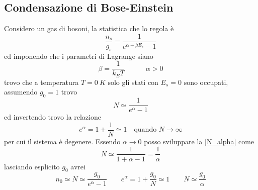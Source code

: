 \subsection{Condensazione di Bose-Einstein}
Considero un gas di bosoni, la statistica che lo regola è 
\begin{equation}
\frac{n_s}{g_s} = \frac{1}{e^{ \alpha + \beta E_s } - 1}
\end{equation}
ed imponendo che i parametri di Lagrange siano
\begin{equation}
\beta = \frac{1}{k_B T} \quad\quad\quad \alpha > 0
\end{equation}
trovo che a temperatura $T = \SI{0}{K}$ solo gli stati con $E_s = 0$ sono occupati, assumendo $g_0  = 1$ trovo
\begin{equation}
N \simeq \frac{ 1}{e^{ \alpha } - 1 }
\label{N_alpha}
\end{equation}
ed invertendo trovo la relazione
\begin{equation}
e^{\alpha} = 1 + \frac{1}{N} \simeq 1 \quad \mbox{quando } N \to \infty
\end{equation}
per cui il sistema è degenere.
Essendo $\alpha \to 0$ posso sviluppare la \ref{N_alpha} come
\begin{equation}
N \simeq \frac{1}{1+ \alpha - 1} = \frac{1}{\alpha}
\end{equation}
lasciando esplicito $g_0$ avrei
\begin{equation}
n_0 \simeq N \simeq \frac{g_0}{e^{ \alpha } - 1 }
\quad\quad
e^{\alpha} = 1 + \frac{g_0}{N} \simeq 1
\quad\quad
N \simeq \frac{g_0}{\alpha}
\end{equation}


